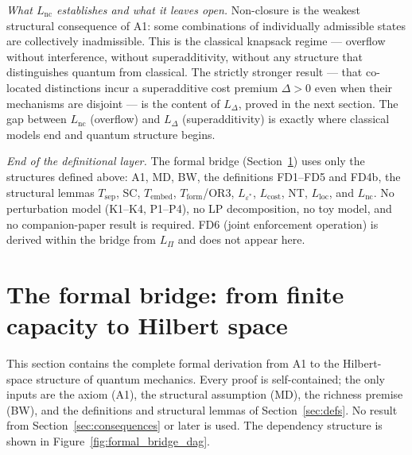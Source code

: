 \documentclass[11pt]{article}
\theoremstyle{remark}
\begin{document}
\noindent\textit{What $L_{\mathrm{nc}}$ establishes and what it leaves open.}  Non-closure is the weakest structural consequence of A1: some combinations of individually admissible states are collectively inadmissible.  This is the classical knapsack regime --- overflow without interference, without superadditivity, without any structure that distinguishes quantum from classical.  The strictly stronger result --- that co-located distinctions incur a superadditive cost premium $\Delta > 0$ even when their mechanisms are disjoint --- is the content of $L_\Delta$, proved in the next section.  The gap between $L_{\mathrm{nc}}$ (overflow) and $L_\Delta$ (superadditivity) is exactly where classical models end and quantum structure begins.


\medskip\noindent\textit{End of the definitional layer.}  The formal bridge
(Section~\ref{sec:formal_bridge}) uses only the structures defined above:
A1, MD, BW, the definitions FD1--FD5 and FD4b, the structural lemmas
$T_{\mathrm{sep}}$, SC, $T_{\mathrm{embed}}$, $T_{\mathrm{form}}$/OR3,
$L_{\varepsilon^*}$, $L_{\mathrm{cost}}$, NT, $L_{\mathrm{loc}}$, and
$L_{\mathrm{nc}}$.  No perturbation model (K1--K4, P1--P4), no LP
decomposition, no toy model, and no companion-paper result is required.
FD6 (joint enforcement operation) is derived within the bridge from
$L_\Pi$ and does not appear here.


\section{The formal bridge: from finite capacity to Hilbert space}
\label{sec:formal_bridge}\label{sec:bridge}

\noindent This section contains the complete formal derivation from A1 to the Hilbert-space structure of quantum mechanics.  Every proof is self-contained; the only inputs are the axiom (A1), the structural assumption (MD), the richness premise (BW), and the definitions and structural lemmas of Section~\ref{sec:defs}.  No result from Section~\ref{sec:consequences} or later is used.  The dependency structure is shown in Figure~\ref{fig:formal_bridge_dag}.
\end{document}
